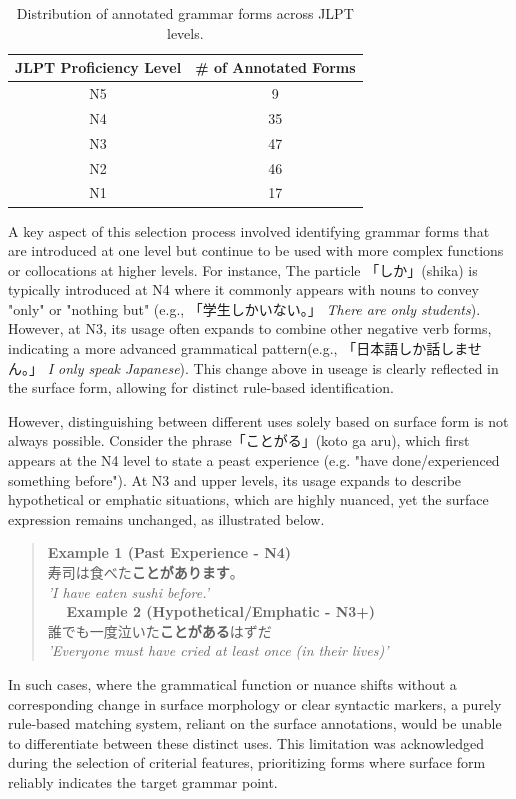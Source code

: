 \begin{table}[h!]
\centering
\begin{tabular}{cc}
\hline \textbf{JLPT Proficiency Level} & \textbf{\# of Annotated Forms} \\ \hline
N5 & 9 \\
N4  & 35 \\
N3 & 47\\
N2 & 46 \\
N1 & 17 \\
\hline
\end{tabular}
\caption{Distribution of annotated grammar forms across JLPT levels. }
\label{tab:CF-Counts}
\end{table}


A key aspect of this selection process involved identifying grammar forms that are introduced at one level but continue
to be used with more complex functions or collocations at higher levels. For instance, The particle 「しか」(shika) is
typically
introduced at N4 where it commonly appears with nouns to convey "only" or "nothing but" (e.g., 「学生しかいない。」
\textit{There are only students}). However, at N3, its usage often expands to combine other negative verb forms,
indicating a more advanced grammatical pattern(e.g., 「日本語しか話しません。」 \textit{I only speak Japanese}). This
change above in
useage is
clearly
reflected in the
surface
form, allowing for distinct rule-based identification.

However, distinguishing between different uses solely based on surface form is not always possible. Consider the
phrase「ことがる」(koto ga aru),
which
first
appears at the N4 level to state a peast experience (e.g. "have done/experienced something before"). At N3 and upper
levels, its usage expands to describe hypothetical or emphatic situations, which are highly nuanced, yet the surface
expression remains unchanged, as illustrated below.

\begin{quote}
\textbf{Example 1 (Past Experience - N4)}\\
寿司は食べた\textbf{ことがあります}。\\
\textit{'I have eaten sushi before.'}\\　
\textbf{Example 2 (Hypothetical/Emphatic - N3+)}\\
誰でも一度泣いた\textbf{ことがある}はずだ\\
\textit{'Everyone must have cried at least once (in their lives)'}\\
\end{quote}
In such cases, where the grammatical function or nuance shifts without a corresponding change in surface morphology
or clear syntactic markers, a purely rule-based matching system, reliant on the surface annotations, would be unable to
differentiate between these distinct uses. This limitation was acknowledged during the
selection of criterial features, prioritizing forms where surface form reliably indicates the target grammar point.


